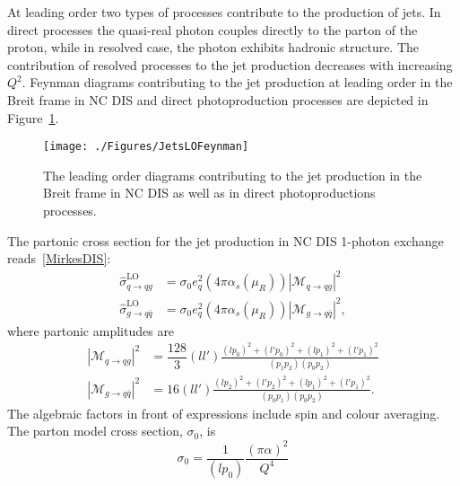 At leading order two types of processes contribute to the production of jets. In direct processes the quasi-real photon couples directly to the parton of the proton, while in resolved case, the photon exhibits hadronic structure. The contribution of resolved processes to the jet production decreases with increasing $Q^2$. Feynman diagrams contributing to the jet production at leading order in the Breit frame in NC DIS and direct photoproduction processes are depicted in Figure~\ref{fig:borndirectfeyn}.

\begin{figure}[h]
 \centering
 \texttt{[image: ./Figures/JetsLOFeynman]}
 \caption{The leading order diagrams contributing to the jet production in the Breit frame in NC DIS as well as in direct photoproductions processes.}
 \label{fig:borndirectfeyn}
\end{figure}

The partonic cross section for the jet production in NC DIS 1-photon exchange reads~\ref{MirkesDIS}:
\begin{align}{}
 \hat{\sigma}^\mathrm{LO}_{q \rightarrow qg} &= \sigma_0 e_q^2 \left( 4\pi \alpha_s\left(\mu_R\right) \right) \left|\mathcal{M}_{q \rightarrow qg} \right|^2 \\
 \hat{\sigma}^\mathrm{LO}_{g \rightarrow q\bar{q}} &= \sigma_0 e_q^2 \left( 4\pi \alpha_s\left(\mu_R\right) \right) \left|\mathcal{M}_{g \rightarrow q\bar{q} } \right|^2,
\end{align}
where partonic amplitudes are
\begin{align}
 \left|\mathcal{M}_{q \rightarrow qg} \right|^2 &= \dfrac{128}{3} \left(ll'\right) \frac{\left(lp_0\right)^2 + \left(l'p_0\right)^2 + \left(lp_1\right)^2 + \left(l'p_1\right)^2 }{\left(p_1p_2\right)\left(p_0p_2\right)}\\
 \left|\mathcal{M}_{g \rightarrow q\bar{q} } \right|^2 &= 16 \left(ll'\right) \frac{\left(lp_2\right)^2 + \left(l'p_2\right)^2 + \left(lp_1\right)^2 + \left(l'p_1\right)^2 }{\left(p_0p_1\right)\left(p_0p_2\right)}.
\end{align}
The algebraic factors in front of expressions include spin and colour averaging. The parton model cross section, $\sigma_0$, is
\begin{equation}
 \sigma_0 = \dfrac{1}{\left(lp_0\right)}\frac{\left(\pi\alpha\right)^2}{Q^4}
\end{equation}

